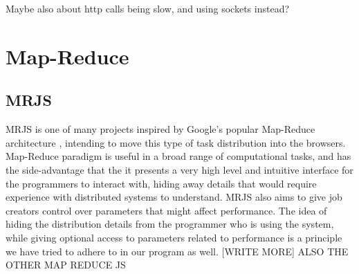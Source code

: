 Maybe also about http calls being slow, and using sockets instead?

\section{Map-Reduce}
\subsection{MRJS \cite{ryza2010mrjs}}
MRJS is one of many projects inspired by Google's popular Map-Reduce architecture \cite{62}, intending to move this type of task distribution into the browsers. Map-Reduce paradigm is useful in a broad range of computational tasks, and has the side-advantage that the it presents a very high level and intuitive interface for the programmers to interact with, hiding away details that would require experience with distributed systems to understand. MRJS also aims to give job creators control over parameters that might affect performance. The idea of hiding the distribution details from the programmer who is using the system, while giving optional access to parameters related to performance is a principle we have tried to adhere to in our program as well. [WRITE MORE]
ALSO THE OTHER MAP REDUCE JS


